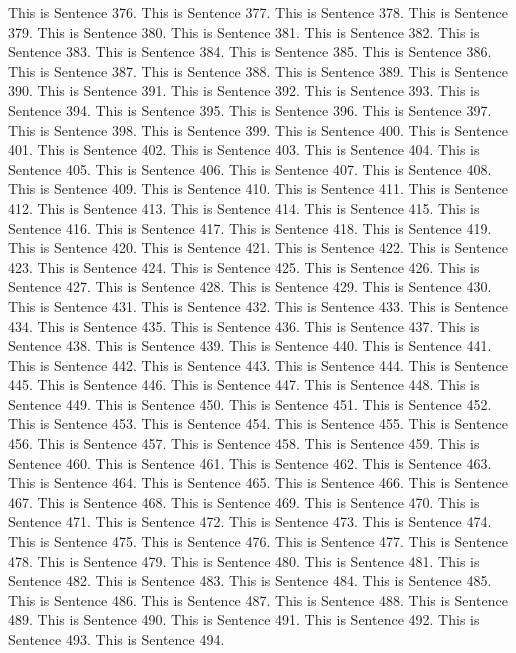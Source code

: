 \documentclass{article}
\begin{document}
This is Sentence 376.
This is Sentence 377.
This is Sentence 378.
This is Sentence 379.
This is Sentence 380.
This is Sentence 381.
This is Sentence 382.
This is Sentence 383.
This is Sentence 384.
This is Sentence 385.
This is Sentence 386.
This is Sentence 387.
This is Sentence 388.
This is Sentence 389.
This is Sentence 390.
This is Sentence 391.
This is Sentence 392.
This is Sentence 393.
This is Sentence 394.
This is Sentence 395.
This is Sentence 396.
This is Sentence 397.
This is Sentence 398.
This is Sentence 399.
This is Sentence 400.
This is Sentence 401.
This is Sentence 402.
This is Sentence 403.
This is Sentence 404.
This is Sentence 405.
This is Sentence 406.
This is Sentence 407.
This is Sentence 408.
This is Sentence 409.
This is Sentence 410.
This is Sentence 411.
This is Sentence 412.
This is Sentence 413.
This is Sentence 414.
This is Sentence 415.
This is Sentence 416.
This is Sentence 417.
This is Sentence 418.
This is Sentence 419.
This is Sentence 420.
This is Sentence 421.
This is Sentence 422.
This is Sentence 423.
This is Sentence 424.
This is Sentence 425.
This is Sentence 426.
This is Sentence 427.
This is Sentence 428.
This is Sentence 429.
This is Sentence 430.
This is Sentence 431.
This is Sentence 432.
This is Sentence 433.
This is Sentence 434.
This is Sentence 435.
This is Sentence 436.
This is Sentence 437.
This is Sentence 438.
This is Sentence 439.
This is Sentence 440.
This is Sentence 441.
This is Sentence 442.
This is Sentence 443.
This is Sentence 444.
This is Sentence 445.
This is Sentence 446.
This is Sentence 447.
This is Sentence 448.
This is Sentence 449.
This is Sentence 450.
This is Sentence 451.
This is Sentence 452.
This is Sentence 453.
This is Sentence 454.
This is Sentence 455.
This is Sentence 456.
This is Sentence 457.
This is Sentence 458.
This is Sentence 459.
This is Sentence 460.
This is Sentence 461.
This is Sentence 462.
This is Sentence 463.
This is Sentence 464.
This is Sentence 465.
This is Sentence 466.
This is Sentence 467.
This is Sentence 468.
This is Sentence 469.
This is Sentence 470.
This is Sentence 471.
This is Sentence 472.
This is Sentence 473.
This is Sentence 474.
This is Sentence 475.
This is Sentence 476.
This is Sentence 477.
This is Sentence 478.
This is Sentence 479.
This is Sentence 480.
This is Sentence 481.
This is Sentence 482.
This is Sentence 483.
This is Sentence 484.
This is Sentence 485.
This is Sentence 486.
This is Sentence 487.
This is Sentence 488.
This is Sentence 489.
This is Sentence 490.
This is Sentence 491.
This is Sentence 492.
This is Sentence 493.
This is Sentence 494.
\end{document}
